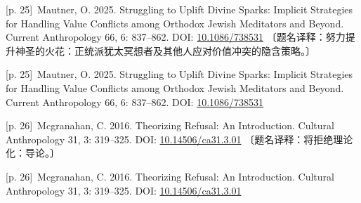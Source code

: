 \documentclass[10pt,a4paper]{article}
\begin{document}
\noindent\begin{minipage}{\textwidth}\begin{minipage}[t]{\dimexpr.5\textwidth-4mm\relax}\noindent\begin{minipage}[t]{\linewidth}{\scriptsize\color{gray} [p. 25]}\ Mautner, O. 2025. Struggling to Uplift Divine Sparks: Implicit Strategies for Handling Value Conflicts among Orthodox Jewish Meditators and Beyond. Current Anthropology 66, 6: 837–862. DOI: \url{10.1086/738531} 〔题名译释：努力提升神圣的火花：正统派犹太冥想者及其他人应对价值冲突的隐含策略。〕\par\end{minipage}\par\end{minipage}\hfill\begin{minipage}[t]{\dimexpr.5\textwidth-4mm\relax}\noindent\begin{minipage}[t]{\linewidth}{\scriptsize\color{gray} [p. 25]}\ Mautner, O. 2025. Struggling to Uplift Divine Sparks: Implicit Strategies for Handling Value Conflicts among Orthodox Jewish Meditators and Beyond. Current Anthropology 66, 6: 837–862. DOI: \url{10.1086/738531}\par\end{minipage}\par\end{minipage}\end{minipage}\par
\noindent\begin{minipage}{\textwidth}\begin{minipage}[t]{\dimexpr.5\textwidth-4mm\relax}\noindent\begin{minipage}[t]{\linewidth}{\scriptsize\color{gray} [p. 26]}\ Mcgranahan, C. 2016. Theorizing Refusal: An Introduction. Cultural Anthropology 31, 3: 319–325. DOI: \url{10.14506/ca31.3.01} 〔题名译释：将拒绝理论化：导论。〕\par\end{minipage}\par\end{minipage}\hfill\begin{minipage}[t]{\dimexpr.5\textwidth-4mm\relax}\noindent\begin{minipage}[t]{\linewidth}{\scriptsize\color{gray} [p. 26]}\ Mcgranahan, C. 2016. Theorizing Refusal: An Introduction. Cultural Anthropology 31, 3: 319–325. DOI: \url{10.14506/ca31.3.01}\par\end{minipage}\par\end{minipage}\end{minipage}\par
\end{document}
